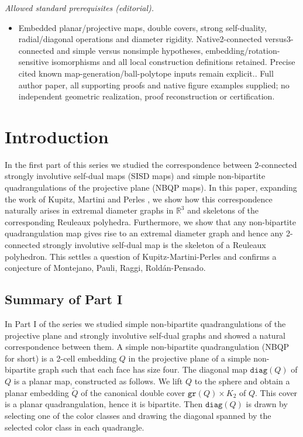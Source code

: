 \documentclass[10pt,a4paper]{article}
\newcounter{example}
\newcommand{\R}[0]{\mathbb{R}}
\newcommand{\diag}[0]{\mathtt{diag}}
\newcommand{\gr}{\mathtt{gr}}
\begin{document}
\noindent\textit{Allowed standard prerequisites (editorial).}\begin{itemize}
\item Embedded planar/projective maps, double covers, strong self-duality, radial/diagonal operations and diameter rigidity. Native2-connected versus3-connected and simple versus nonsimple hypotheses, embedding/rotation-sensitive isomorphisms and all local construction definitions retained. Precise cited known map-generation/ball-polytope inputs remain explicit.. Full author paper, all supporting proofs and native figure examples supplied; no independent geometric realization, proof reconstruction or certification.
\end{itemize}\medskip
\section{Introduction}




In the first part of this series we studied the correspondence between 2-connected strongly involutive self-dual maps (SISD maps) and  simple non-bipartite quadrangulations of the projective plane (NBQP maps). In this paper, expanding the work of Kupitz, Martini and Perles \cite{kupitz2010ball}, we  show how this correspondence naturally arises in extremal diameter graphs in $\R^3$ and skeletons of the corresponding Reuleaux polyhedra. Furthermore, we show that any non-bipartite quadrangulation map gives rise to an extremal diameter graph and hence any 2-connected strongly involutive self-dual map is the skeleton of a Reuleaux polyhedron. This settles a question of Kupitz-Martini-Perles and confirms a conjecture of Montejano, Pauli, Raggi, Roldán-Pensado.  

\subsection{Summary of Part I}




In Part I of the series we studied simple non-bipartite quadrangulations of the projective plane and strongly involutive self-dual graphs and showed a natural correspondence between them. A simple non-bipartite quadrangulation (NBQP for short) is a 2-cell embedding $Q$ in the projective plane of a simple non-bipartite graph such that each face has size four. The diagonal map $\diag(Q)$ of $Q$ is a planar map, constructed as follows. We lift $Q$ to the sphere and obtain a planar embedding $\widetilde Q$ of the canonical double cover $\gr(Q)\times K_2$ of $Q$. This cover is a planar quadrangulation, hence it is bipartite. Then $\diag(Q)$ is drawn by selecting one of the color classes and drawing the diagonal spanned by the selected color class in each quadrangle. 
\end{document}
